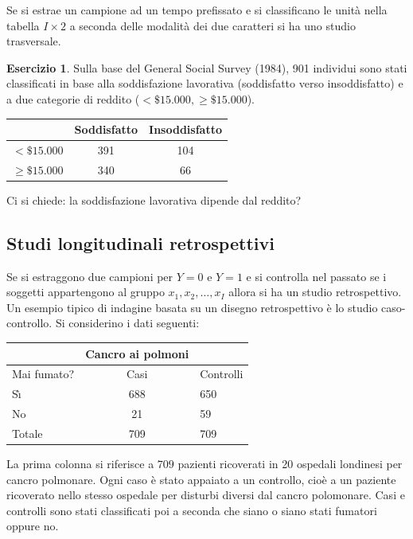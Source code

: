 \documentclass[
  11pt,
]{krantz}
\theoremstyle{definition}
\theoremstyle{definition}
\theoremstyle{definition}
\newtheorem{exercise}{Esercizio}[chapter]
\theoremstyle{definition}
\theoremstyle{remark}
\begin{document}
Se si estrae un campione ad un tempo prefissato e si classificano le unità nella tabella \(I \times 2\) a seconda delle modalità dei due caratteri si ha uno studio trasversale.

\begin{exercise}
Sulla base del General Social Survey (1984), 901 individui sono stati classificati in base alla soddisfazione lavorativa (soddisfatto verso insoddisfatto) e a due categorie di reddito (\(< \$ 15.000, \geq \$ 15.000\)).

\begin{longtable}[]{@{}lcc@{}}
\toprule
& Soddisfatto & Insoddisfatto \\
\midrule
\endhead
\(< \$ 15.000\) & 391 & 104 \\
\(\geq \$ 15.000\) & 340 & 66 \\
\bottomrule
\end{longtable}

Ci si chiede: la soddisfazione lavorativa dipende dal reddito?
\end{exercise}

\hypertarget{studi-longitudinali-retrospettivi}{%
\subsection{Studi longitudinali retrospettivi}\label{studi-longitudinali-retrospettivi}}

Se si estraggono due campioni per \(Y = 0\) e \(Y = 1\) e si controlla nel passato se i soggetti appartengono al gruppo \(x_1, x_2, \dots, x_I\) allora si ha un studio retrospettivo. Un esempio tipico di indagine basata su un disegno retrospettivo è lo studio caso-controllo. Si considerino i dati seguenti:

\begin{longtable}[]{@{}lcl@{}}
\toprule
& Cancro ai polmoni & \\
\midrule
\endhead
Mai fumato? & Casi & Controlli \\
Sı̀ & 688 & 650 \\
No & 21 & 59 \\
Totale & 709 & 709 \\
\bottomrule
\end{longtable}

La prima colonna si riferisce a \(709\) pazienti ricoverati in 20 ospedali londinesi per cancro polmonare. Ogni caso è stato appaiato a un controllo, cioè a un paziente ricoverato nello stesso ospedale per disturbi diversi dal cancro polomonare. Casi e controlli sono stati classificati poi a seconda che siano o siano stati fumatori oppure no.
\end{document}
